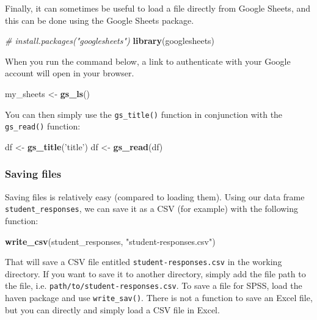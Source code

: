 \documentclass[]{article}
\newenvironment{Shaded}{\begin{snugshade}}{\end{snugshade}}
\newcommand{\KeywordTok}[1]{\textcolor[rgb]{0.13,0.29,0.53}{\textbf{#1}}}
\newcommand{\StringTok}[1]{\textcolor[rgb]{0.31,0.60,0.02}{#1}}
\newcommand{\CommentTok}[1]{\textcolor[rgb]{0.56,0.35,0.01}{\textit{#1}}}
\newcommand{\NormalTok}[1]{#1}
\begin{document}
Finally, it can sometimes be useful to load a file directly from Google
Sheets, and this can be done using the Google Sheets package.

\begin{Shaded}
\begin{Highlighting}[]
\CommentTok{# install.packages("googlesheets")}
\KeywordTok{library}\NormalTok{(googlesheets)}
\end{Highlighting}
\end{Shaded}

When you run the command below, a link to authenticate with your Google
account will open in your browser.

\begin{Shaded}
\begin{Highlighting}[]
\NormalTok{my_sheets <-}\StringTok{ }\KeywordTok{gs_ls}\NormalTok{()}
\end{Highlighting}
\end{Shaded}

You can then simply use the \texttt{gs\_title()} function in conjunction
with the \texttt{gs\_read()} function:

\begin{Shaded}
\begin{Highlighting}[]
\NormalTok{df <-}\StringTok{ }\KeywordTok{gs_title}\NormalTok{(}\StringTok{'title'}\NormalTok{)}
\NormalTok{df <-}\StringTok{ }\KeywordTok{gs_read}\NormalTok{(df)}
\end{Highlighting}
\end{Shaded}

\subsubsection{Saving files}\label{saving-files}

Saving files is relatively easy (compared to loading them). Using our
data frame \texttt{student\_responses}, we can save it as a CSV (for
example) with the following function:

\begin{Shaded}
\begin{Highlighting}[]
\KeywordTok{write_csv}\NormalTok{(student_responses, }\StringTok{"student-responses.csv"}\NormalTok{)}
\end{Highlighting}
\end{Shaded}

That will save a CSV file entitled \texttt{student-responses.csv} in the
working directory. If you want to save it to another directory, simply
add the file path to the file, i.e.
\texttt{path/to/student-responses.csv}. To save a file for SPSS, load
the haven package and use \texttt{write\_sav()}. There is not a function
to save an Excel file, but you can directly and simply load a CSV file
in Excel.
\end{document}
